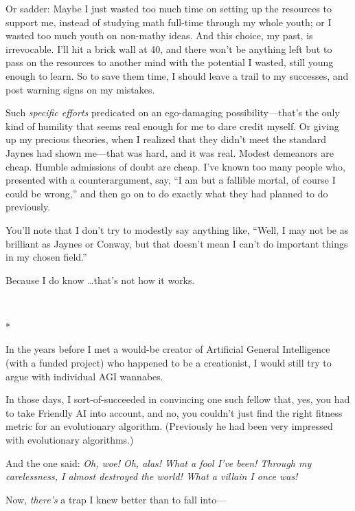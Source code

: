 {
 Or sadder: Maybe I just wasted too much time on setting up the
resources to support me, instead of studying math full-time through my
whole youth; or I wasted too much youth on non-mathy ideas. And this
choice, my past, is irrevocable. I'll hit a brick wall
at 40, and there won't be anything left but to pass on
the resources to another mind with the potential I wasted, still young
enough to learn. So to save them time, I should leave a trail to my
successes, and post warning signs on my mistakes.}

{
 Such \textit{specific efforts} predicated on an ego-damaging
possibility---that's the only kind of humility that
seems real enough for me to dare credit myself. Or giving up my
precious theories, when I realized that they didn't
meet the standard Jaynes had shown me---that was hard, and it was real.
Modest demeanors are cheap. Humble admissions of doubt are cheap.
I've known too many people who, presented with a
counterargument, say, ``I am but a fallible mortal, of
course I could be wrong,'' and then go on to do
exactly what they had planned to do previously.}

{
 You'll note that I don't try to
modestly say anything like, ``Well, I may not be as
brilliant as Jaynes or Conway, but that doesn't mean I
can't do important things in my chosen
field.''}

{
 Because I do know \ldots that's not how it works.}

{\centering
 \ ~
\par}

{\centering
 *
\par}


{
 In the years before I met a would-be creator of Artificial General
Intelligence (with a funded project) who happened to be a creationist,
I would still try to argue with individual AGI wannabes. }

{
 In those days, I sort-of-succeeded in convincing one such fellow
that, yes, you had to take Friendly AI into account, and no, you
couldn't just find the right fitness metric for an
evolutionary algorithm. (Previously he had been very impressed with
evolutionary algorithms.)}

{
 And the one said: \textit{Oh, woe! Oh, alas! What a fool
I've been! Through my carelessness, I almost destroyed
the world! What a villain I once was!}}

{
 Now, \textit{there's} a trap I knew better than to
fall into---}

